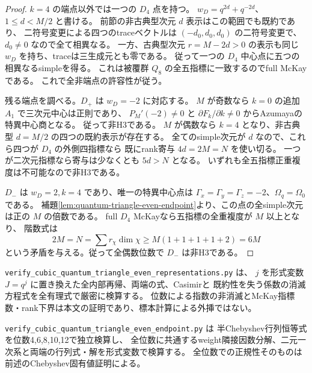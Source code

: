 \begin{proof}
$k=4$ の端点以外では一つの $D_4$ 点を持つ。
$w_D=q^{2d}+q^{-2d}$、$1\le d<M/2$ と書ける。
前節の非古典型次元 $d$ 表示はこの範囲でも既約であり、
二符号変更による四つのtraceベクトルは
$(-d_0,d_0,d_0)$ の二符号変更で、$d_0\ne0$ なので全て相異なる。
一方、古典型次元 $r=M-2d>0$ の表示も同じ $w_D$ を持ち、traceは三生成元とも零である。
従って一つの $D_4$ 中心点に五つの相異なるsimpleを得る。
これは被覆群 $Q_8$ の全五指標に一致するのでfull McKayである。
これで全非端点の許容性が従う。

残る端点を調べる。$D_+$ は $w_D=-2$ に対応する。
$M$ が奇数なら $k=0$ の追加 $A_1$ で三次元中心は正則であり、
$P_M'(-2)\ne0$ と $\partial F_k/\partial k\ne0$ からAzumayaの特異中心商となる。
従って非H3である。
$M$ が偶数なら $k=4$ となり、非古典型 $d=M/2$ の四つの既約表示が存在する。
全てのsimple次元が $d$ なので、これら四つが $D_4$ の外側四指標なら
既にrank寄与 $4d=2M=N$ を使い切る。
一つが二次元指標なら寄与は少なくとも $5d>N$ となる。
いずれも全五指標正重複度は不可能なので非H3である。

$D_-$ は $w_D=2,k=4$ であり、唯一の特異中心点は
$\Gamma_x=\Gamma_y=\Gamma_z=-2$、$\Omega_q=\Omega_0$ である。
補題\ref{lem:quantum-triangle-even-endpoint}より、この点の全simple次元は正の $M$ の倍数である。
full $D_4$ McKayなら五指標の全重複度が $M$ 以上となり、
階数式は
\[
 2M=N=\sum r_\chi\dim\chi\ge M(1+1+1+1+2)=6M
\]
という矛盾を与える。従って全偶数位数で $D_-$ は非H3である。
\end{proof}

\texttt{verify\_cubic\_quantum\_triangle\_\allowbreak even\_representations.py} は、
$j$ を形式変数 $J=q^j$ に置き換えた全内部再帰、両端の式、Casimirと
既約性を失う係数の消滅方程式を全有理式で厳密に検算する。
位数による指数の非消滅とMcKay指標数・rank下界は本文の証明であり、標本計算による外挿ではない。

\texttt{verify\_cubic\_quantum\_triangle\_\allowbreak even\_endpoint.py} は
半Chebyshev行列恒等式を位数4,6,8,10,12で独立検算し、
全位数に共通するweight隣接因数分解、二元一次系と両端の行列式・解を形式変数で検算する。
全位数での正規性そのものは前述のChebyshev固有値証明による。

